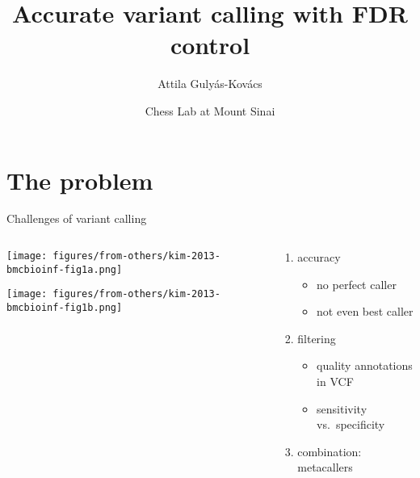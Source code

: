 \documentclass{beamer} %
\title{Accurate variant calling with FDR control}
\author{Attila Guly\'{a}s-Kov\'{a}cs}
\date{Chess Lab at Mount Sinai}
\begin{document}
\begin{frame}[plain, label=title]
\maketitle
\end{frame}

\section{The problem}

\begin{frame}{Challenges of variant calling}
\begin{columns}[t]
\begin{column}{0.4\textwidth}

\texttt{[image: figures/from-others/kim-2013-bmcbioinf-fig1a.png]}

\texttt{[image: figures/from-others/kim-2013-bmcbioinf-fig1b.png]}
\end{column}
\begin{column}{0.5\textwidth}
\begin{enumerate}
\item accuracy
\begin{itemize}
\item no perfect caller
\item not even best caller
\end{itemize}
\item filtering
\begin{itemize}
\item quality annotations in VCF
\item sensitivity vs.~specificity
\end{itemize}
\item combination: \alert{meta}callers
\end{enumerate}
\end{column}
\end{columns}
\end{frame}


%
%
%
\end{document}
